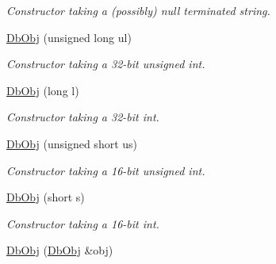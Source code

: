 \begin{CompactItemize}
\begin{CompactList}\small\item\em Constructor taking a (possibly) null terminated string. \item\end{CompactList}\item 
\hypertarget{classutil_1_1DbObj_62f11587e8f18e0651899a705a81cb57}{
\hyperlink{classutil_1_1DbObj_62f11587e8f18e0651899a705a81cb57}{DbObj} (unsigned long ul)}
\label{classutil_1_1DbObj_62f11587e8f18e0651899a705a81cb57}

\begin{CompactList}\small\item\em Constructor taking a 32-bit unsigned int. \item\end{CompactList}\item 
\hypertarget{classutil_1_1DbObj_6e0111e212b37df66882bdb72e9c8c6c}{
\hyperlink{classutil_1_1DbObj_6e0111e212b37df66882bdb72e9c8c6c}{DbObj} (long l)}
\label{classutil_1_1DbObj_6e0111e212b37df66882bdb72e9c8c6c}

\begin{CompactList}\small\item\em Constructor taking a 32-bit int. \item\end{CompactList}\item 
\hypertarget{classutil_1_1DbObj_457d23bfb694740c2218bd5040e35447}{
\hyperlink{classutil_1_1DbObj_457d23bfb694740c2218bd5040e35447}{DbObj} (unsigned short us)}
\label{classutil_1_1DbObj_457d23bfb694740c2218bd5040e35447}

\begin{CompactList}\small\item\em Constructor taking a 16-bit unsigned int. \item\end{CompactList}\item 
\hypertarget{classutil_1_1DbObj_bf2739aefeef09b66ff61afc3e265c80}{
\hyperlink{classutil_1_1DbObj_bf2739aefeef09b66ff61afc3e265c80}{DbObj} (short s)}
\label{classutil_1_1DbObj_bf2739aefeef09b66ff61afc3e265c80}

\begin{CompactList}\small\item\em Constructor taking a 16-bit int. \item\end{CompactList}\item 
\hypertarget{classutil_1_1DbObj_7b47bfe0c0e78e0f422ea07e2610fe14}{
\hyperlink{classutil_1_1DbObj_7b47bfe0c0e78e0f422ea07e2610fe14}{DbObj} (\hyperlink{classutil_1_1DbObj}{DbObj} \&obj)}
\label{classutil_1_1DbObj_7b47bfe0c0e78e0f422ea07e2610fe14}


\end{CompactItemize}
